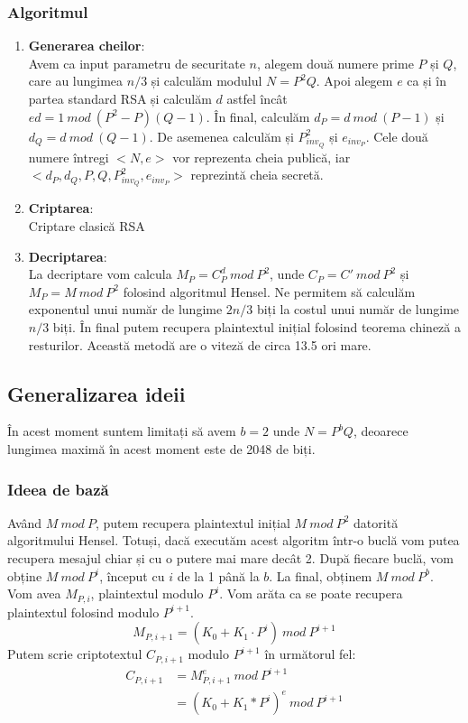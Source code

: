 \documentclass[12pt, oneside]{book}
\begin{document}
		  \subsubsection{Algoritmul}
		  \begin{enumerate}
		   \item \textbf{Generarea cheilor}: \\
		   Avem ca input parametru de securitate $n$, alegem două numere prime $P$ și $Q$, care au lungimea $n/3$ și calculăm modulul $N=P^2Q$. Apoi alegem $e$ ca și în partea standard RSA și calculăm $d$ astfel încât $ed=1 \ mod \ (P^2-P)(Q-1)$. În final, calculăm $d_P= d \ mod \ (P-1)$ și $ d_Q=d \ mod \ (Q-1)$. De asemenea calculăm și $P_{inv_Q}^{2}$ și $e_{inv_P}$. Cele două numere întregi $<N,e>$ vor reprezenta cheia publică, iar $<d_P,d_Q,P,Q,P_{inv_Q}^{2},e_{inv_P}>$ reprezintă cheia secretă. 
		   
		   \item \textbf{Criptarea}: \\
		   Criptare clasică RSA
		   
		   \item \textbf{Decriptarea}: \\
		   La decriptare vom calcula $M_P = C_{P}^{d} \ mod \ P^2$, unde $C_P = C '\ mod \ P^2$ și $M_P = M \ mod \ P^2$ folosind algoritmul Hensel. Ne permitem să calculăm exponentul unui număr de lungime $2n/3$ biți la costul unui număr de lungime $n/3$ biți. În final putem recupera plaintextul inițial folosind teorema chineză a resturilor. Această metodă are o viteză de circa 13.5 ori mare.
		  \end{enumerate}
		  
		  \subsection{Generalizarea ideii}
		  În acest moment suntem limitați să avem $b=2$ unde $N=P^bQ$, deoarece lungimea maximă în acest moment este de 2048 de biți.
		  \subsubsection{Ideea de bază}
		  Având $M \ mod \ P$, putem recupera plaintextul inițial $ M \ mod \ P^2$ datorită algoritmului Hensel. Totuși, dacă executăm acest algoritm într-o buclă vom putea recupera mesajul chiar și cu o putere mai mare decât 2. După fiecare buclă, vom obține $ M  \ mod \ P^i$, început cu $i$ de la 1 până la $b$. La final, obținem $M \ mod \ P^b$. Vom avea $M_{P,i}$, plaintextul modulo $P^i$. Vom arăta ca se poate recupera plaintextul folosind modulo $P^{i+1}.$
		  $$M_{P,i+1} = (K_0 +K_1 \cdot   P^i) \ mod \ P^{i+1}$$
		  Putem scrie criptotextul $C_{P,i+1}$ modulo $P^{i+1}$ în următorul fel:
		  \begin{align*}
		  C_{P,i+1} &= M_{P,i+1}^{e} \ mod \ P^{i+1}\\
		   &= (K_0+K_1*P^i)^e \ mod \ P^{i+1} 
		  \end{align*}
		  
\end{document}

